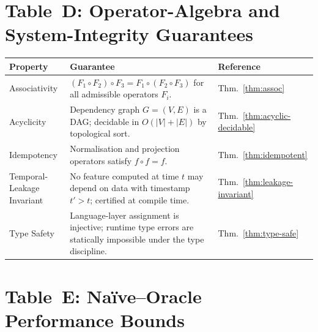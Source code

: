\documentclass[12pt,openany]{book}
\numberwithin{equation}{chapter}
\theoremstyle{plain}
\theoremstyle{definition}
\theoremstyle{remark}
\numberwithin{equation}{chapter}
\theoremstyle{plain}
\begin{document}
\section*{Table~D: Operator-Algebra and System-Integrity Guarantees}

\begin{center}
\begin{tabularx}{\textwidth}{@{} l X l @{}}
\hline
\textbf{Property} & \textbf{Guarantee} & \textbf{Reference} \\
\hline
Associativity &
  $(F_1 \circ F_2)\circ F_3 = F_1\circ(F_2\circ F_3)$ for all admissible
  operators $F_i$. &
  Thm.~\ref{thm:assoc} \\
\addlinespace
Acyclicity &
  Dependency graph $G=(V,E)$ is a DAG; decidable in $O(|V|+|E|)$ by
  topological sort. &
  Thm.~\ref{thm:acyclic-decidable} \\
\addlinespace
Idempotency &
  Normalisation and projection operators satisfy $f\circ f = f$. &
  Thm.~\ref{thm:idempotent} \\
\addlinespace
Temporal-Leakage Invariant &
  No feature computed at time $t$ may depend on data with timestamp
  $t' > t$; certified at compile time. &
  Thm.~\ref{thm:leakage-invariant} \\
\addlinespace
Type Safety &
  Language-layer assignment is injective; runtime type errors are
  statically impossible under the type discipline. &
  Thm.~\ref{thm:type-safe} \\
\hline
\end{tabularx}
\end{center}

\section*{Table~E: Na\"{i}ve--Oracle Performance Bounds}
\end{document}
